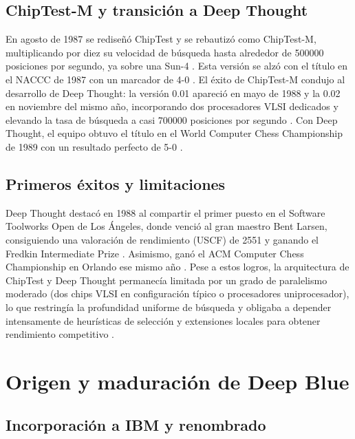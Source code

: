 \documentclass[a4paper, 12pt]{article}
\begin{document}
\subsection{ChipTest-M y transición a Deep Thought}
En agosto de 1987 se rediseñó ChipTest y se rebautizó como 
ChipTest-M, multiplicando por diez su velocidad de búsqueda 
hasta alrededor de 500000 posiciones por segundo, ya sobre una 
Sun-4 \cite{Hsu1989}. Esta versión se alzó con el título en el 
NACCC de 1987 con un marcador de 4-0 \cite{Hsu1989}. El éxito de 
ChipTest-M condujo al desarrollo de Deep Thought: la versión 
0.01 apareció en mayo de 1988 y la 0.02 en noviembre del mismo 
año, incorporando dos procesadores VLSI dedicados y elevando la 
tasa de búsqueda a casi 700000 posiciones por segundo 
\cite{Hsu1990}. Con Deep Thought, el equipo obtuvo el título en 
el World Computer Chess Championship de 1989 con un resultado 
perfecto de 5-0 \cite{Hsu1990}.

\subsection{Primeros éxitos y limitaciones}

Deep Thought destacó en 1988 al compartir el primer puesto en el 
Software Toolworks Open de Los Ángeles, donde venció al gran 
maestro Bent Larsen, consiguiendo una valoración de rendimiento 
(USCF) de 2551 y ganando el Fredkin Intermediate Prize 
\cite{Hsu1990}. Asimismo, ganó el ACM Computer Chess 
Championship en Orlando ese mismo año \cite{Hsu1990}. Pese a 
estos logros, la arquitectura de ChipTest y Deep Thought 
permanecía limitada por un grado de paralelismo moderado 
(dos chips VLSI en configuración típico o procesadores 
uniprocesador), lo que restringía la profundidad uniforme de 
búsqueda y obligaba a depender intensamente de heurísticas de 
selección y extensiones locales para obtener rendimiento 
competitivo \cite{Hsu1990}.








\section{Origen y maduración de Deep Blue}

\subsection{Incorporación a IBM y renombrado}
\end{document}
